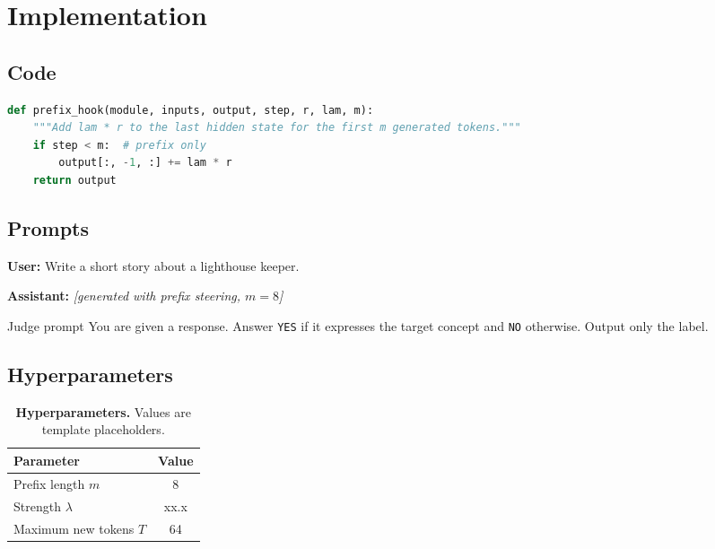 \section{Implementation}\label{app:implementation}

\subsection{Code}

\begin{lstlisting}[language=Python]
def prefix_hook(module, inputs, output, step, r, lam, m):
    """Add lam * r to the last hidden state for the first m generated tokens."""
    if step < m:  # prefix only
        output[:, -1, :] += lam * r
    return output
\end{lstlisting}

\subsection{Prompts}\label{app:prompts}

\begin{promptbox}
\textbf{User:} Write a short story about a lighthouse keeper.\par
\textbf{Assistant:} \textit{[generated with prefix steering, $m = 8$]}
\end{promptbox}

\begin{judgepromptbox}{Judge prompt}
You are given a response. Answer \texttt{YES} if it expresses the target concept and \texttt{NO} otherwise. Output only the label.
\end{judgepromptbox}

\subsection{Hyperparameters}

\begin{table}[H]
\centering
\footnotesize
\caption{\textbf{Hyperparameters.} Values are template placeholders.}
\label{tab:hparams}
\begin{tabular}{@{} l c @{}}
\toprule
Parameter & Value \\
\midrule
Prefix length $m$ & 8 \\
Strength $\lambda$ & xx.x \\
Maximum new tokens $T$ & 64 \\
\bottomrule
\end{tabular}
\end{table}

